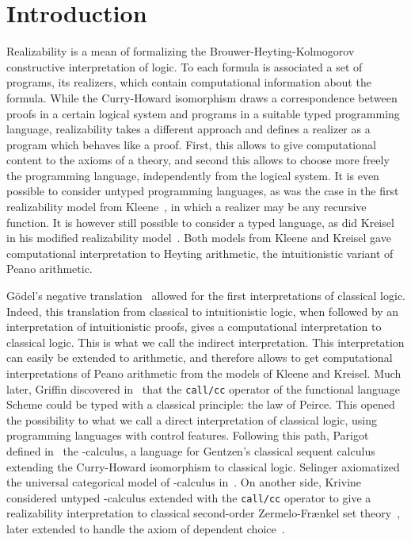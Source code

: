 \documentclass{CSML}
\begin{document}
\section*{Introduction}
Realizability is a mean of formalizing the Brouwer-Heyting-Kolmogorov constructive interpretation of logic. To each formula is associated a set of programs, its realizers, which contain computational information about the formula. While the Curry-Howard isomorphism draws a correspondence between proofs in a certain logical system and programs in a suitable typed programming language, realizability takes a different approach and defines a realizer as a program which behaves like a proof. First, this allows to give computational content to the axioms of a theory, and second this allows to choose more freely the programming language, independently from the logical system. It is even possible to consider untyped programming languages, as was the case in the first realizability model from Kleene~\cite{Kleene}, in which a realizer may be any recursive function. It is however still possible to consider a typed language, as did Kreisel in his modified realizability model~\cite{Kreisel}. Both models from Kleene and Kreisel gave computational interpretation to Heyting arithmetic, the intuitionistic variant of Peano arithmetic.\par
G\"odel's negative translation~\cite{GodelNegative} allowed for the first interpretations of classical logic. Indeed, this translation from classical to intuitionistic logic, when followed by an interpretation of intuitionistic proofs, gives a computational interpretation to classical logic. This is what we call the indirect interpretation. This interpretation can easily be extended to arithmetic, and therefore allows to get computational interpretations of Peano arithmetic from the models of Kleene and Kreisel. Much later, Griffin discovered in~\cite{GriffinControl} that the \texttt{call/cc} operator of the functional language Scheme could be typed with a classical principle: the law of Peirce. This opened the possibility to what we call a direct interpretation of classical logic, using programming languages with control features. Following this path, Parigot defined in~\cite{ParigotLambdaMu} the -calculus, a language for Gentzen's classical sequent calculus extending the Curry-Howard isomorphism to classical logic. Selinger axiomatized the universal categorical model of -calculus in~\cite{SelingerControl}. On another side, Krivine considered untyped -calculus extended with the \texttt{call/cc} operator to give a realizability interpretation to classical second-order Zermelo-Fr\ae nkel set theory~\cite{KrivineZF}, later extended to handle the axiom of dependent choice~\cite{KrivineDependent,KrivinePanoramas}.\par
\end{document}
